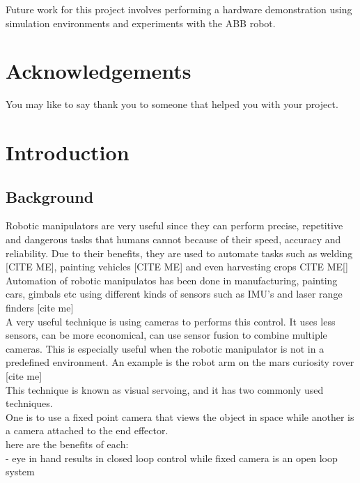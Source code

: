 \documentclass{UoNMCHA}
\numberwithin{equation}{section}
\begin{document}
  Future work for this project involves performing a hardware demonstration using simulation environments and experiments with the ABB robot. 

\vspace{-2mm}
\section*{Acknowledgements}
\vspace{-3mm}
You may like to say thank you to someone that helped you with your project.
\newpage
\tableofcontents
\newpage
\section{Introduction}
    
   \subsection{Background}
   Robotic manipulators are very useful since they can perform precise, repetitive and dangerous tasks that humans cannot because of their speed, accuracy and reliability. Due to their benefits, they are used to automate tasks such as welding [CITE ME], painting vehicles [CITE ME] and even harvesting crops CITE ME[]\\ 
      
   Automation of robotic manipulatos has been done in manufacturing, painting cars, gimbals etc using different kinds of sensors such as IMU's and laser range finders [cite me]\\
   
   A very useful technique is using cameras to performs this control. It uses less sensors, can be more economical, can use sensor fusion to combine multiple cameras. This is especially useful when the robotic manipulator is not in a predefined environment. An example is the robot arm on the mars curiosity rover [cite me] \\
   
   This technique is known as visual servoing, and it has two commonly used techniques. \\
   One is to use a fixed point camera that views the object in space while another is a camera attached to the end effector.\\
    here are the benefits of each:\\
    - eye in hand results in closed loop control while fixed camera is an open loop system\\
    
\end{document}

